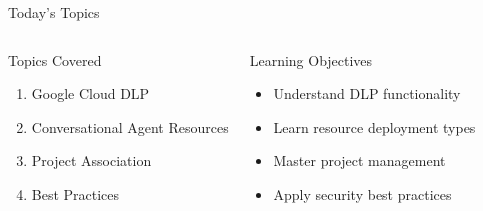 \documentclass[aspectratio=169]{beamer}
\begin{document}
\begin{frame}{Today's Topics}
    \begin{columns}
        \begin{block}{\textcolor{googleblue}{\faClipboardList} Topics Covered}
            \begin{enumerate}
                \item Google Cloud DLP
                \item Conversational Agent Resources
                \item Project Association
                \item Best Practices
            \end{enumerate}
        \end{block}
        
        \begin{block}{\textcolor{googlegreen}{\faGraduationCap} Learning Objectives}
            \begin{itemize}
                \item Understand DLP functionality
                \item Learn resource deployment types
                \item Master project management
                \item Apply security best practices
            \end{itemize}
        \end{block}
    \end{columns}
    
    \vspace{1em}
    \begin{center}
    \end{center}
\end{frame}
\end{document}
